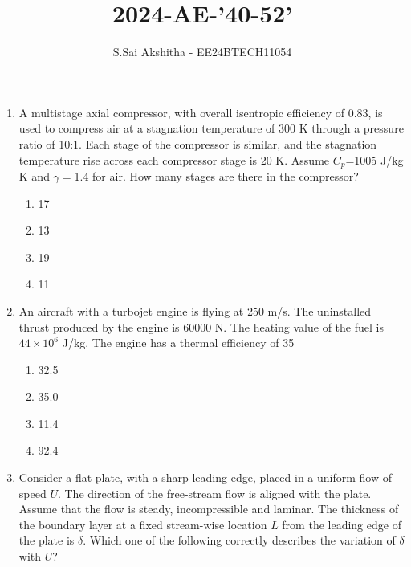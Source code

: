 \documentclass[journal,12pt,onecolumn]{IEEEtran}
\theoremstyle{remark}
\begin{document}

\vspace{3cm}

\title{2024-AE-'40-52'}
\author{S.Sai Akshitha - EE24BTECH11054}
\newpage
\maketitle
\bigskip

\renewcommand{\thefigure}{\theenumi}
\renewcommand{\thetable}{\theenumi}

\begin{enumerate}
    \item A multistage axial compressor, with overall isentropic efficiency of 0.83, is used to compress air at a stagnation temperature of 300 K through a pressure ratio of 10:1. Each stage of the compressor is similar, and the stagnation temperature rise across each compressor stage is 20 K. Assume $C_p$=1005 J/kg K and $\gamma=$1.4 for air. How many stages are there in the compressor?
    
    \begin{enumerate}
        \item 17
        \item 13
        \item 19
        \item 11
    \end{enumerate}
    
    \item An aircraft with a turbojet engine is flying at 250 m/s. The uninstalled thrust produced by the engine is 60000 N. The heating value of the fuel is $44 \times 10^6$ J/kg. The engine has a thermal efficiency of 35%
    
    \begin{enumerate}
        \item 32.5
        \item 35.0
        \item 11.4
        \item 92.4
    \end{enumerate}
    
    \item Consider a flat plate, with a sharp leading edge, placed in a uniform flow of speed $U$. The direction of the free-stream flow is aligned with the plate. Assume that the flow is steady, incompressible and laminar. The thickness of the boundary layer at a fixed stream-wise location $L$ from the leading edge of the plate is $\delta$. Which one of the following correctly describes the variation of $\delta$ with $U$?
    

\end{enumerate}
\end{document}
